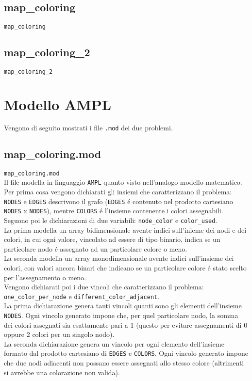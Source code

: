 \documentclass{article}
\begin{document}
\subsection{map\_coloring}
\texttt{map\_coloring}
\pagebreak

\subsection{map\_coloring\_2}
\texttt{map\_coloring\_2}
\pagebreak

\section{Modello AMPL}
Vengono di seguito mostrati i file \texttt{.mod} dei due problemi.\\

\subsection{map\_coloring.mod}
\texttt{map\_coloring.mod}
\\

Il file modella in linguaggio \texttt{AMPL} quanto visto nell'analogo modello matematico.\\
Per prima cosa vengono dichiarati gli insiemi che caratterizzano il problema: \texttt{NODES} e \texttt{EDGES} descrivono il grafo (\texttt{EDGES} \'e contenuto nel prodotto cartesiano \texttt{NODES} x \texttt{NODES}), mentre \texttt{COLORS} \'e l'insieme contenente i colori assegnabili.\\

Seguono poi le dichiarazioni di due variabili: \texttt{node\_color} e \texttt{color\_used}.\\
La prima modella un array bidimensionale avente indici sull'inieme dei nodi e dei colori, in cui ogni valore, vincolato ad essere di tipo binario, indica se un particolare nodo \'e assegnato ad un particolare colore o meno.\\
La seconda modella un array monodimensionale avente indici sull'insieme dei colori, con valori ancora binari che indicano se un particolare colore \'e stato scelto per l'assegnamento o meno.\\ 

Vengono dichiarati poi i due vincoli che caratterizzano il problema: \texttt{one\_color\_per\_node} e \texttt{different\_color\_adjacent}.\\
La prima dichiarazione genera tanti vincoli quanti sono gli elementi dell'insieme \texttt{NODES}. Ogni vincolo generato impone che, per quel particolare nodo, la somma dei colori assegnati sia esattamente pari a 1 (questo per evitare assegnamenti di 0 oppure 2 colori per un singolo nodo).\\
La seconda dichiarazione genera un vincolo per ogni elemento dell'insieme formato dal prodotto cartesiano di \texttt{EDGES} e \texttt{COLORS}. Ogni vincolo generato impone che due nodi adiacenti non possano essere assegnati allo stesso colore (altrimenti si avrebbe una colorazione non valida).\\
\end{document}
